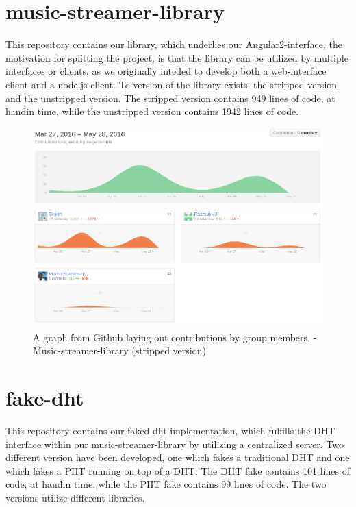 \section{music-streamer-library}
\label{sec:appendix-music-streamer-library}
This repository contains our library, which underlies our Angular2-interface,
the motivation for splitting the project, is that the library can be utilized 
by multiple interfaces or clients, as we originally inteded to develop both a
web-interface client and a node.js client.
\newline\newline
To version of the library exists; the stripped version and the unstripped
version. The stripped version contains 949 lines of code, at handin time, while
the unstripped version contains 1942 lines of code.

\begin{figure}[H]
  \centering
    \includegraphics[width=\linewidth]{gfx/Music-streamer-library}
    \caption{A graph from Github laying out contributions by group members. - Music-streamer-library (stripped version)}
  \label{fig:music-stramer-library}
\end{figure}

\section{fake-dht}
This repository contains our faked dht implementation, which fulfills the \acs{DHT}
interface within our music-streamer-library by utilizing a centralized server.
\newline
Two different version have been developed, one which fakes a traditional \acs{DHT}
and one which fakes a \acs{PHT} running on top of a \acs{DHT}.
\newline\newline
The \acs{DHT} fake contains 101 lines of code, at handin time, while the \acs{PHT} fake 
contains 99 lines of code. The two versions utilize different libraries.


